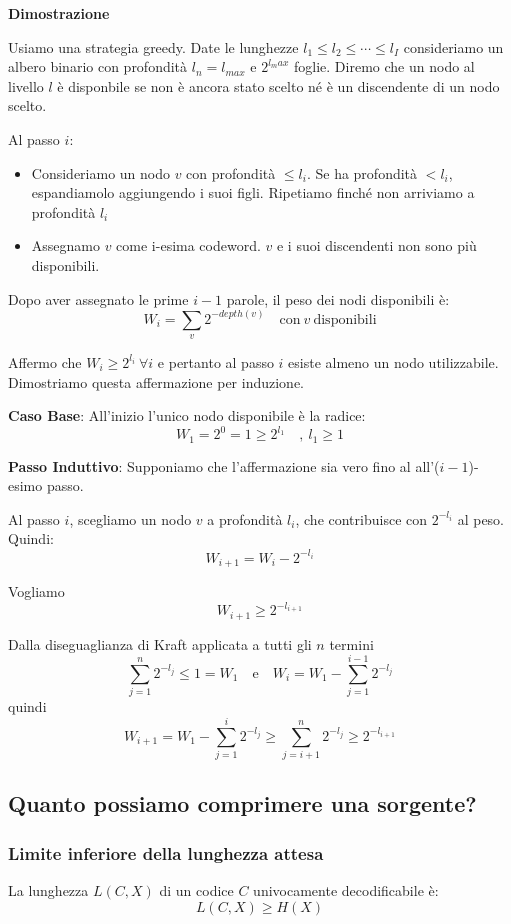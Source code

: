 \textbf{Dimostrazione}

Usiamo una strategia greedy. Date le lunghezze $l_1 \leq l_2 \leq \cdots \leq l_I$ consideriamo un albero binario con profondità $l_n = l_{max}$ e $2^{l_max}$ foglie. Diremo che un nodo al livello $l$ è disponbile se non è ancora stato scelto né è un discendente di un nodo scelto.

Al passo $i$:
\begin{itemize}
	\item Consideriamo un nodo $v$ con profondità $\leq l_i$. Se ha profondità $< l_i$, espandiamolo aggiungendo i suoi figli. Ripetiamo finché non arriviamo a profondità $l_i$
	\item Assegnamo $v$ come i-esima codeword. $v$ e i suoi discendenti non sono più disponibili.
\end{itemize}

Dopo aver assegnato le prime $i-1$ parole, il peso dei nodi disponibili è:
$$
W_i = \sum_{v} 2^{-depth(v)}\quad\text{con}\ v\ \text{disponibili}  
$$

\newpage

Affermo che $W_i \geq 2^{l_i}\ \forall i$ e pertanto al passo $i$ esiste almeno un nodo utilizzabile. Dimostriamo questa affermazione per induzione.

\textbf{Caso Base}: All'inizio l'unico nodo disponibile è la radice:
$$
W_1 = 2^0 = 1 \geq 2^{l_1}\quad,\ l_1 \geq 1
$$

\textbf{Passo Induttivo}: Supponiamo che l'affermazione sia vero fino al all'($i-1$)-esimo passo.

Al passo $i$, scegliamo un nodo $v$ a profondità $l_i$, che contribuisce con $2^{-l_i}$ al peso. Quindi:
$$
W_{i+1} = W_i - 2^{-l_i}
$$

Vogliamo $$W_{i+1} \geq 2^{-l_{i+1}}$$

Dalla diseguaglianza di Kraft applicata a tutti gli $n$ termini
$$
\sum_{j=1}^{n} 2^{-l_j} \leq 1 = W_1	\quad \text{e} \quad W_i = W_1 - \sum_{j=1}^{i-1} 2^{-l_j}
$$
quindi
$$
W_{i+1} = W_1 - \sum_{j=1}^{i} 2^{-l_j} \geq \sum_{j=i+1}^{n} 2^{-l_j} \geq 2^{-l_{i+1}}
$$

\subsection{Quanto possiamo comprimere una sorgente?}
\subsubsection{Limite inferiore	della lunghezza attesa}
La lunghezza $L(C,X)$ di un codice $C$ univocamente decodificabile è: 
\begin{equation}
	L(C,X) \geq H(X)
\end{equation}

